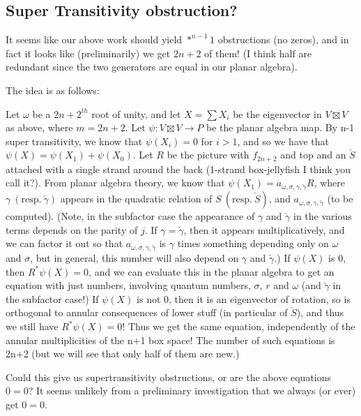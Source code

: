\documentclass[12pt]{article}
\begin{document}
\subsection{Super Transitivity obstruction?} 

It seems like our above work should yield $*^{n-1}1$ obstructions (no zeros), and in fact it looks like (preliminarily) we get $2n+2$ of them! (I think half are redundant since the two generators are equal in our planar algebra).

The idea is as follows:

Let $\omega$ be a $2n+2^{th}$ root of unity, and let $X=\sum X_{i}$ be the eigenvector in $V\boxtimes V$ as above, where $m=2n+2$. Let $\psi: V\boxtimes V\rightarrow P$ be the planar algebra map.  By n-1 super transitivity, we know that $\psi(X_i)=0$ for $i>1$, and so we have that $\psi(X)=\psi(X_1)+\psi(X_0)$.  Let $R$ be the picture with $f_{2n+2}$ and top and an $\check{S}$ attached with a single strand around the back (1-strand box-jellyfish I think you call it?).  From planar algebra theory, we know that $\psi(X_1)=a_{\omega, \sigma, \gamma, \check{\gamma}} R$, where $\gamma\ (\text{resp.}\ \check{\gamma})$ appears in the quadratic relation of $S\ (\text{resp.}\ \check{S})$, and $a_{\omega, \sigma, \gamma, \check{\gamma}}$ (to be computed). (Note, in the subfactor case the appearance of $\gamma$ and $\check{\gamma}$ in the various terms depends on the parity of $j$.  If $\gamma=\check{\gamma}$, then it appears multiplicatively, and we can factor it out so that $a_{\omega, \sigma, \gamma, \check{\gamma}}$ is $\gamma$ times something depending only on $\omega$ and $\sigma$, but in general, this number will also depend on $\gamma$ and $\check{\gamma}$.) If $\psi(X)$ is $0$, then $R^{*}\psi(X)=0$, and we can evaluate this in the planar algebra to get an equation with just numbers, involving quantum numbers, $\sigma$, $r$ and $\omega$ (and $\check{\gamma}$ in the subfactor case!)  If $\psi(X)$ is not $0$, then it is an eigenvector of rotation, so is orthogonal to annular consequences of lower stuff (in particular of $\check{S}$), and thus we still have $R^{*}\psi(X)=0$!  Thus we get the same equation, independently of the annular multiplicities of the n+1 box space!  The number of such equations is 2n+2 (but we will see that only half of them are new.)




Could this give us supertransitivity obstructions, or are the above equations  $0=0$?  It seems unlikely from a preliminary investigation that we always (or ever) get $0=0$.
\end{document}
